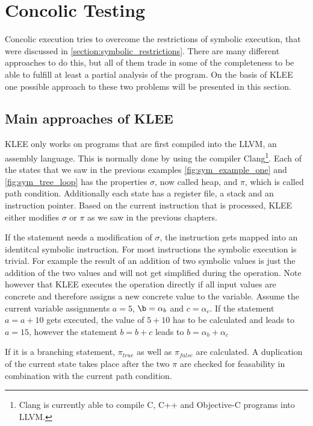 \section{Concolic Testing} \label{section:concolic_testing}
Concolic execution tries to overcome the restrictions of symbolic execution, that were discussed in \ref{section:symbolic_restrictions}. There are many different approaches to do this, but all of them trade in some of the completeness to be able to fulfill at least a partial analysis of the program.
On the basis of KLEE \cite{Cadar:2008:KUA:1855741.1855756} one possible approach to these two problems will be presented in this section.

\subsection{Main approaches of KLEE}
KLEE only works on programs that are first compiled into the LLVM, an assembly language. This is normally done by using the compiler Clang\footnote{Clang is currently able to compile C, C++  and Objective-C programs into LLVM.}. 
Each of the states that we saw in the previous examples \ref{fig:sym_example_one} and \ref{fig:sym_tree_loop} has the properties $\sigma$, now called heap, and $\pi$, which is called path condition. Additionally each state has a register file, a stack and an instruction pointer. Based on the current instruction that is processed, KLEE either modifies $\sigma$ or $\pi$ as we saw in the previous chapters.

If the statement needs a modification of $\sigma$, the instruction gets mapped into an identitcal symbolic instruction. For most instructions the symbolic execution is trivial. For example the result of an addition of two symbolic values is just the addition of the two values and will not get simplified during the operation. Note however that KLEE executes the operation directly if all input values are concrete and therefore assigns a new concrete value to the variable.
Assume the current variable assignments $a = 5$, $\b = \alpha_b$ and $c=\alpha_c$. If the statement $a = a + 10$ gets executed, the value of $5 + 10$ has to be calculated and leads to $a = 15$, however the statement $b = b + c$ leads to $b = \alpha_b + \alpha_c$

If it is a branching statement, $\pi_{true}$ as well as $\pi_{false}$ are calculated. A duplication of the current state takes place after the two $\pi$ are checked for feasability in combination with the current path condition.

